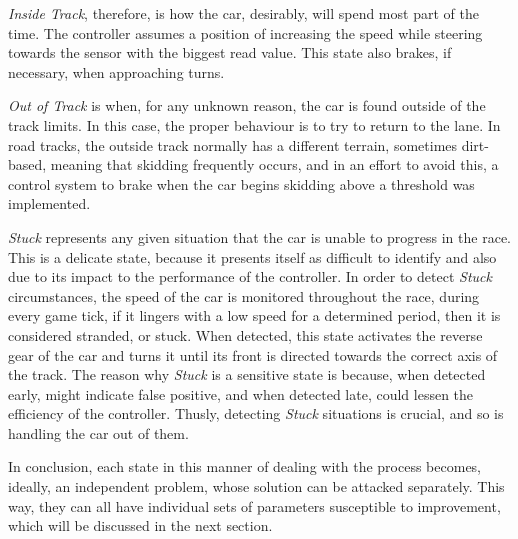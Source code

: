 	\emph{Inside Track}, therefore, is how the car, desirably, will spend most part of the time. The controller
	assumes a position of increasing the speed while steering towards the sensor with the biggest read value. This
	state also brakes, if necessary, when approaching turns.
		
	\emph{Out of Track} is when, for any unknown reason, the car is found outside of the track limits. In this case,
	the proper behaviour is to try to return to the lane. In road tracks, the outside track normally has a different
	terrain, sometimes dirt-based, meaning that skidding frequently occurs, and in an effort to avoid this, a control
	system to brake when the car begins skidding above a threshold was implemented.
	
	\emph{Stuck} represents any given situation that the car is unable to progress in the race. This is a delicate
	state, because it presents itself as difficult to identify and also due to its impact to the performance of the
	controller. In order to detect \emph{Stuck} circumstances, the speed of the car is monitored throughout the race,
	during every game tick, if it lingers with a low speed for a determined period, then it is considered stranded,
	or stuck. When detected, this state activates the reverse gear of the car and turns it until its front is
	directed towards the correct axis of the track. The reason why \emph{Stuck} is a sensitive state is because, when
	detected early, might indicate false positive, and when detected late, could lessen the efficiency of the
	controller. Thusly, detecting \textit{Stuck} situations is crucial, and so is handling the car out of them.
	
	
	In conclusion, each state in this manner of dealing with the process becomes, ideally, an independent problem,
	whose solution can be attacked separately. This way, they can all have individual sets of parameters susceptible
	to improvement, which will be discussed in the next section.
	
